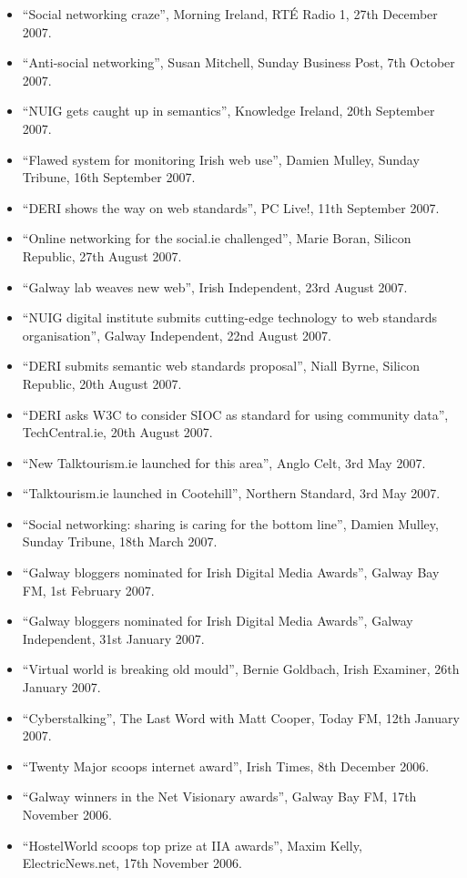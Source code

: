 \documentclass[10pt,a4paper]{res} %
\begin{document}
\begin{resume}
{\begin{itemize}
\item ``Social networking craze'', Morning Ireland, RT\'{E} Radio 1, 27th December 2007.
\item ``Anti-social networking'', Susan Mitchell, Sunday Business Post, 7th October 2007.
\item ``NUIG gets caught up in semantics'', Knowledge Ireland, 20th September 2007.
\item ``Flawed system for monitoring Irish web use'', Damien Mulley, Sunday Tribune, 16th September 2007.
\item ``DERI shows the way on web standards'', PC Live!, 11th September 2007.
\item ``Online networking for the social.ie challenged'', Marie Boran, Silicon Republic, 27th August 2007.
\item ``Galway lab weaves new web'', Irish Independent, 23rd August 2007.
\item ``NUIG digital institute submits cutting-edge technology to web standards organisation'', Galway Independent, 22nd August 2007.
\item ``DERI submits semantic web standards proposal'', Niall Byrne, Silicon Republic, 20th August 2007.
\item ``DERI asks W3C to consider SIOC as standard for using community data'', TechCentral.ie, 20th August 2007.
\item ``New Talktourism.ie launched for this area'', Anglo Celt, 3rd May 2007.
\item ``Talktourism.ie launched in Cootehill'', Northern Standard, 3rd May 2007.
\item ``Social networking: sharing is caring for the bottom line'', Damien Mulley, Sunday Tribune, 18th March 2007.
\item ``Galway bloggers nominated for Irish Digital Media Awards'', Galway Bay FM, 1st February 2007.
\item ``Galway bloggers nominated for Irish Digital Media Awards'', Galway Independent, 31st January 2007.
\item ``Virtual world is breaking old mould'', Bernie Goldbach, Irish Examiner, 26th January 2007.
\item ``Cyberstalking'', The Last Word with Matt Cooper, Today FM, 12th January 2007.
\item ``Twenty Major scoops internet award'', Irish Times, 8th December 2006.
\item ``Galway winners in the Net Visionary awards'', Galway Bay FM, 17th November 2006.
\item ``HostelWorld scoops top prize at IIA awards'', Maxim Kelly, ElectricNews.net, 17th November 2006.

\end{itemize}}
\end{resume}
\end{document}
